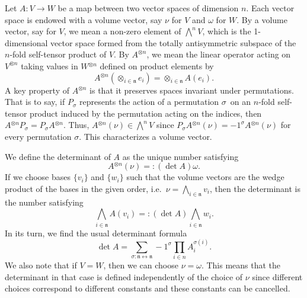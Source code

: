 \documentclass[11pt]{article}
\theoremstyle{remark}
\begin{document}
Let $A:V \to W$ be a map between two vector spaces of dimension
$n$. Each vector space is endowed with a
volume vector, say  $\nu$ for $V$ and $\omega$ for $W$. By a volume
vector, say for $V$, we mean a non-zero  element of $\bigwedge^n V$, which is
the 1-dimensional vector space formed from the totally
antisymmetric subspace of the $n$-fold self-tensor product of $V$.
By $A^{\otimes n}$, we mean the linear operator acting on $V^{\otimes
n}$ 
taking
values in $W\ensuremath{^{\otimes n} }$ defined on product elements by
\[
A\ensuremath{^{\otimes n} } (\mathop{\otimes}_{i \in \ensuremath{\mathfrak{n}}} e_i ) = \mathop{\otimes}_{i \in \ensuremath{\mathfrak{n}}} A(e_i).
\] 
A key property of $A\ensuremath{^{\otimes n} }$ is that it preserves spaces invariant
under permutations. That is to say, if $P_{\ensuremath{\sigma}}$ represents the
action of a 
permutation \ensuremath{\sigma}\  on
an $n$-fold self-tensor product induced by the permutation acting on
the indices, then $A \ensuremath{^{\otimes n} } P_{\ensuremath{\sigma}} = P_{\ensuremath{\sigma}} A \ensuremath{^{\otimes n} }$. 
Thus, $A \ensuremath{^{\otimes n} } (\nu) \in
\bigwedge^n V$ since  $P_{\ensuremath{\sigma}} A \ensuremath{^{\otimes n} }
(\nu)
= -1^{\ensuremath{\sigma}} A \ensuremath{^{\otimes n} } (\nu)$ for every permutation $\ensuremath{\sigma}$. This
characterizes a volume vector. 

We define the determinant of $A$ as the unique number satisfying
\begin{equation} \label{7e:detdef}
A\ensuremath{^{\otimes n} } (\nu) \ensuremath{=:} (\det A) \omega.
\end{equation} 
If we choose 
bases $\{v_i\}$ and $\{w_i\}$ such that the volume vectors are the wedge
product of the bases in the given order, i.e.\ $\nu = \bigwedge_{i \in
\ensuremath{\mathfrak{n}}} v_i$, then the
 determinant is the number satisfying 
\begin{equation} \label{ae:det}
\bigwedge_{i\in \ensuremath{\mathfrak{n}}} A( v_i) \ensuremath{=:} (\det A)  \bigwedge_{i
\in\ensuremath{\mathfrak{n}}} 
w_i.
\end{equation}
In its turn, we find the usual determinant formula 
\[
\det A = \sum_{\ensuremath{\sigma}: \ensuremath{\mathfrak{n}} \leftrightarrow \ensuremath{\mathfrak{n}}} -1^{\ensuremath{\sigma}}
\prod_{i \in n} A_i^{\ensuremath{\sigma}(i)}.  
\]
We also note that if $V=W$, then we can choose $\nu = \omega$. This
means that the determinant in that case is defined independently of the
choice of $\nu$ since different choices correspond to different
constants and these constants can be cancelled. 
\end{document}
